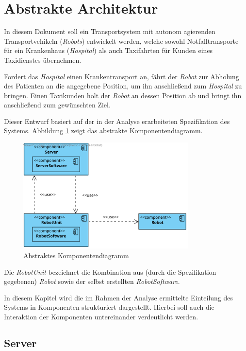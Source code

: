 \section{Abstrakte Architektur}
In diesem Dokument soll ein Transportsystem mit autonom agierenden Transportvehikeln (\emph{Robots}) entwickelt werden, welche sowohl Notfalltransporte für ein Krankenhaus (\emph{Hospital}) als auch Taxifahrten für Kunden eines Taxidienstes übernehmen. 

Fordert das \emph{Hospital} einen Krankentransport an, fährt der \emph{Robot} zur Abholung des Patienten an die angegebene Position, um ihn anschließend zum \emph{Hospital} zu bringen.
Einen Taxikunden holt der \emph{Robot} an dessen Position ab und bringt ihn anschließend zum gewünschten Ziel.

Dieser Entwurf basiert auf der in der Analyse erarbeiteten Spezifikation des Systems. Abbildung \ref{KomponentendiagrammAbstrakt} zeigt das abstrakte Komponentendiagramm.

\begin{figure}[H]
	\centering
	\includegraphics[width=0.8\textwidth]{img/AbstrakteArchitektur}
	\caption{Abstraktes Komponentendiagramm}
	\label{KomponentendiagrammAbstrakt}
\end{figure}

Die \emph{RobotUnit} bezeichnet die Kombination aus (durch die Spezifikation gegebenen) \emph{Robot} sowie der selbst erstellten \emph{RobotSoftware}.

In diesem Kapitel wird die im Rahmen der Analyse ermittelte Einteilung des Systems in Komponenten strukturiert dargestellt. 
Hierbei soll auch die Interaktion der Komponenten untereinander verdeutlicht werden.

\subsection{Server}

